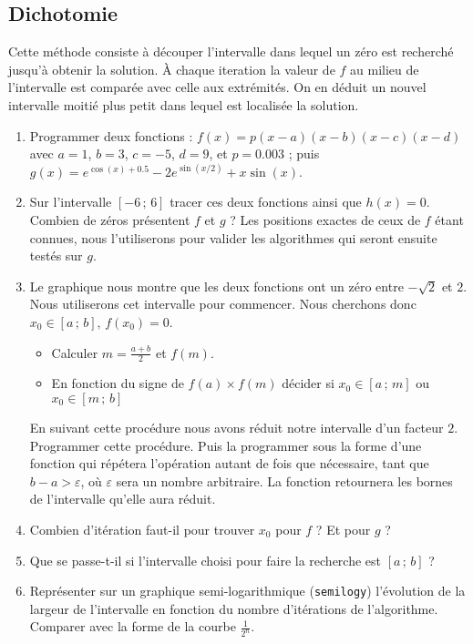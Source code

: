 \subsection{Dichotomie}
Cette méthode consiste à découper l'intervalle dans lequel
un zéro est recherché jusqu'à obtenir la solution. À chaque iteration
la valeur de $f$ au milieu de l'intervalle est comparée avec celle aux extrémités. On en déduit un nouvel intervalle moitié plus petit dans lequel est localisée la solution.
\begin{enumerate}
\item Programmer deux fonctions :
$f(x) = p(x-a)(x-b)(x-c)(x-d)$ avec $a=1$, $b=3$, $c=-5$, $d=9$, et $p=0.003$ ;
puis $g(x) = e^{\cos (x) + 0.5} - 2 e^{\sin(x/2)}+x\sin(x)$.
\item Sur l'intervalle $[-6\,;\,6]$ tracer ces deux fonctions ainsi
que $h(x)=0$. Combien de zéros présentent $f$ et $g$ ? Les positions exactes
de ceux de $f$ étant connues, nous l'utiliserons pour valider les algorithmes
qui seront ensuite testés sur $g$.
\item Le graphique nous montre que les deux fonctions ont un zéro entre $-\sqrt{2}$ et $2$. Nous utiliserons cet intervalle pour commencer. Nous cherchons donc $x_0 \in [a\,;\,b], \, f(x_0)=0$.
\begin{itemize}
\item Calculer $m=\frac{a+b}{2}$ et $f(m)$.
\item En fonction du signe de $f(a)\times{}f(m)$ décider si   $x_0 \in [a\,;\,m]$  ou  $x_0 \in [m\,;\,b]$
\end{itemize}
 En suivant cette procédure nous avons réduit notre intervalle d'un facteur $2$.
Programmer cette procédure. Puis la programmer sous la forme
d'une fonction qui répétera l'opération autant de fois que nécessaire, tant que $b-a > \varepsilon $, où $\varepsilon$ sera un nombre arbitraire. La fonction retournera
les bornes de l'intervalle qu'elle aura réduit.
\item Combien d'itération faut-il pour trouver $x_0$ pour $f$ ? Et pour $g$ ?
\item Que se passe-t-il si l'intervalle choisi pour faire la recherche est
 $[a\,;\,b]$ ?
\item Représenter sur un graphique semi-logarithmique ({\tt semilogy})
l'évolution de la largeur de l'intervalle
en fonction du nombre d'itérations de l'algorithme. Comparer avec la forme
de la courbe $\frac{1}{2^n}$.
\end{enumerate}
